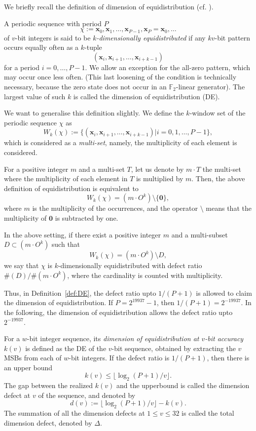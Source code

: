 \documentclass[acmnow]{acmtrans2m}
\def\F2{{\mathbb F}_2}
\def\bx{{{\mathbf x}}}
\begin{document}
We briefly recall the definition of dimension of 
equidistribution (cf. \cite{CLT}). 
\begin{definition}\label{def:DE}
A periodic sequence with period $P$
$$\chi:=\bx_0, \bx_1, \ldots, \bx_{P-1}, \bx_P=\bx_0, \ldots$$
of $v$-bit integers is said to be {\em $k$-dimensionally equidistributed}
if any $kv$-bit pattern occurs equally often as a $k$-tuple
$$
(\bx_i, \bx_{i+1}, \ldots, \bx_{i+k-1})
$$
for a period $i=0,\ldots, P-1$.
We allow an exception for 
the all-zero pattern, which may occur once less often.
(This last loosening of the condition is technically
necessary, because the zero state does not occur
in an $\F2$-linear generator). 
The largest value of such $k$ is called the dimension 
of equidistribution (DE).
\end{definition}

We want to generalise this definition slightly.
We define the $k$-window set of the periodic sequence $\chi$
as
$$
W_k(\chi):=
\{(\bx_i, \bx_{i+1}, \ldots, \bx_{i+k-1}) | 
i =0,1,\ldots, P-1\},
$$
which is considered as a {\em multi-set}, namely, 
the multiplicity of each element is considered. 

For a positive integer $m$ and a multi-set $T$,
let us denote by $m \cdot T$ the multi-set 
where the multiplicity of each element in $T$ is
multiplied by $m$. Then, the above definition of
equidistribution is equivalent to 
$$
W_k(\chi)=(m\cdot O^k) \setminus \{{\mathbf 0}\},
$$
where $m$ is the multiplicity of the occurrences,
and the operator $\setminus$ means that the multiplicity
of ${\mathbf 0}$ is subtracted by one. 

\begin{definition}
In the above setting, if there exist a positive integer $m$ 
and a multi-subset
$D \subset (m\cdot O^k)$
such that
$$
W_k(\chi)=(m\cdot O^k) \setminus D,
$$
we say that $\chi$ is $k$-dimensionally equidistributed 
with defect ratio $\#(D)/\#(m \cdot O^k)$, 
where the cardinality is counted with multiplicity. 
\end{definition}
Thus, in Definition~\ref{def:DE}, the defect ratio upto $1/(P+1)$
is allowed to claim the dimension of equidistribution.
If $P=2^{19937}-1$, then $1/(P+1)=2^{-19937}$. 
In the following, the dimension of equidistribution 
allows the defect ratio upto $2^{-19937}$. 

For a $w$-bit integer sequence, its {\em dimension of 
equidistribution at $v$-bit accuracy} $k(v)$
is defined as the DE of the $v$-bit sequence, obtained by extracting
the $v$ MSBs from each of $w$-bit integers.
If the defect ratio is $1/(P+1)$, 
then there is an upper bound 
$$
k(v) \leq \lfloor \log_2 (P+1) / v \rfloor.
$$
The gap between the realized $k(v)$ and the upperbound is
called the dimension defect at $v$ of the sequence,
and denoted by
$$
d(v):=\lfloor \log_2 (P+1) / v \rfloor -k(v).
$$
The summation of all the dimension defects at
$1 \leq v \leq 32$ is called the total dimension defect, 
denoted by $\Delta$.
\end{document}
